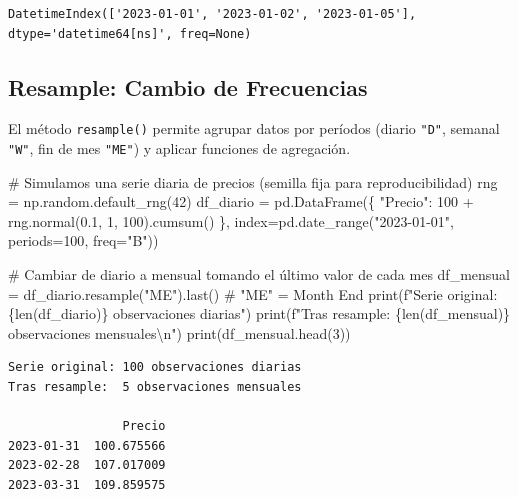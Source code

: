 \documentclass[
  spanish,
  letterpaper,
  DIV=11,
  numbers=noendperiod]{scrreprt}
\newenvironment{Shaded}{\begin{snugshade}}{\end{snugshade}}
\newcommand{\BuiltInTok}[1]{\textcolor[rgb]{0.00,0.23,0.31}{#1}}
\newcommand{\CharTok}[1]{\textcolor[rgb]{0.13,0.47,0.30}{#1}}
\newcommand{\CommentTok}[1]{\textcolor[rgb]{0.37,0.37,0.37}{#1}}
\newcommand{\DecValTok}[1]{\textcolor[rgb]{0.68,0.00,0.00}{#1}}
\newcommand{\FloatTok}[1]{\textcolor[rgb]{0.68,0.00,0.00}{#1}}
\newcommand{\NormalTok}[1]{\textcolor[rgb]{0.00,0.23,0.31}{#1}}
\newcommand{\OperatorTok}[1]{\textcolor[rgb]{0.37,0.37,0.37}{#1}}
\newcommand{\SpecialCharTok}[1]{\textcolor[rgb]{0.37,0.37,0.37}{#1}}
\newcommand{\SpecialStringTok}[1]{\textcolor[rgb]{0.13,0.47,0.30}{#1}}
\newcommand{\StringTok}[1]{\textcolor[rgb]{0.13,0.47,0.30}{#1}}
\begin{document}
\begin{verbatim}
DatetimeIndex(['2023-01-01', '2023-01-02', '2023-01-05'], dtype='datetime64[ns]', freq=None)
\end{verbatim}

\subsection{Resample: Cambio de
Frecuencias}\label{resample-cambio-de-frecuencias}

El método \texttt{resample()} permite agrupar datos por períodos (diario
\texttt{"D"}, semanal \texttt{"W"}, fin de mes \texttt{"ME"}) y aplicar
funciones de agregación.

\label{resample-ejemplo}
\begin{Shaded}
\begin{Highlighting}[]
\CommentTok{\# Simulamos una serie diaria de precios (semilla fija para reproducibilidad)}
\NormalTok{rng }\OperatorTok{=}\NormalTok{ np.random.default\_rng(}\DecValTok{42}\NormalTok{)}
\NormalTok{df\_diario }\OperatorTok{=}\NormalTok{ pd.DataFrame(\{}
    \StringTok{"Precio"}\NormalTok{: }\DecValTok{100} \OperatorTok{+}\NormalTok{ rng.normal(}\FloatTok{0.1}\NormalTok{, }\DecValTok{1}\NormalTok{, }\DecValTok{100}\NormalTok{).cumsum()}
\NormalTok{\}, index}\OperatorTok{=}\NormalTok{pd.date\_range(}\StringTok{"2023{-}01{-}01"}\NormalTok{, periods}\OperatorTok{=}\DecValTok{100}\NormalTok{, freq}\OperatorTok{=}\StringTok{"B"}\NormalTok{))}

\CommentTok{\# Cambiar de diario a mensual tomando el último valor de cada mes}
\NormalTok{df\_mensual }\OperatorTok{=}\NormalTok{ df\_diario.resample(}\StringTok{"ME"}\NormalTok{).last()  }\CommentTok{\# "ME" = Month End}
\BuiltInTok{print}\NormalTok{(}\SpecialStringTok{f"Serie original: }\SpecialCharTok{\{}\BuiltInTok{len}\NormalTok{(df\_diario)}\SpecialCharTok{\}}\SpecialStringTok{ observaciones diarias"}\NormalTok{)}
\BuiltInTok{print}\NormalTok{(}\SpecialStringTok{f"Tras resample:  }\SpecialCharTok{\{}\BuiltInTok{len}\NormalTok{(df\_mensual)}\SpecialCharTok{\}}\SpecialStringTok{ observaciones mensuales}\CharTok{\textbackslash{}n}\SpecialStringTok{"}\NormalTok{)}
\BuiltInTok{print}\NormalTok{(df\_mensual.head(}\DecValTok{3}\NormalTok{))}
\end{Highlighting}
\end{Shaded}

\begin{verbatim}
Serie original: 100 observaciones diarias
Tras resample:  5 observaciones mensuales

                Precio
2023-01-31  100.675566
2023-02-28  107.017009
2023-03-31  109.859575
\end{verbatim}
\end{document}
